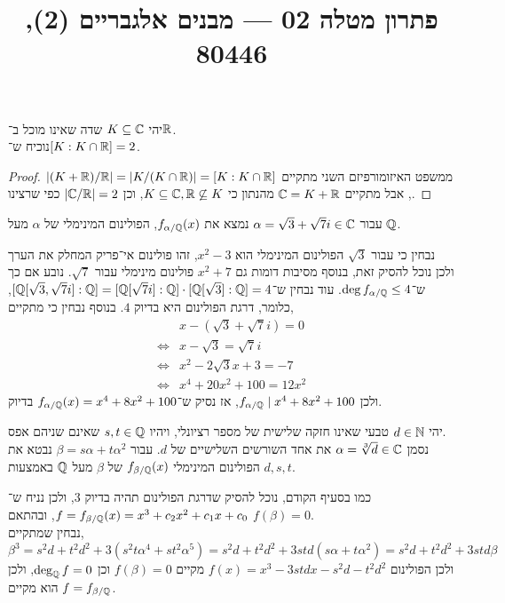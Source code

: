 
\title{פתרון מטלה 02 --- מבנים אלגבריים (2), 80446}


\maketitle
\maketitleprint{}

\question{}
יהי $K \subseteq \mathbb{C}$ שדה שאינו מוכל ב־$\mathbb{R}$. \\
נוכיח ש־$[K : K \cap \mathbb{R}] = 2$.
\begin{proof}
	ממשפט האיזומורפיזם השני מתקיים $|(K + \mathbb{R}) / \mathbb{R}| = |K / (K \cap \mathbb{R})| = [K : K \cap \mathbb{R}]$, אבל מתקיים $\mathbb{C} = K + \mathbb{R}$ מהנתון כי $K \subseteq \mathbb{C}, \mathbb{R} \not\subseteq K$, וכן $|\mathbb{C} / \mathbb{R}| = 2$ כפי שרצינו.
\end{proof}

\question{}
\subquestion{}
עבור $\alpha = \sqrt{3} + \sqrt{7} i \in \mathbb{C}$ נמצא את $f_{\alpha / \mathbb{Q}}(x)$, הפולינום המינימלי של $\alpha$ מעל $\mathbb{Q}$.
\begin{solution}
	נבחין כי עבור $\sqrt{3}$ הפולינום המינימלי הוא $x^2 - 3$, זהו פולינום אי־פריק המחלק את הערך ולכן נוכל להסיק זאת, בנוסף מסיבות דומות גם $x^2 + 7$ פולינום מינימלי עבור $\sqrt{7}$.
	נובע אם כך ש־$\deg f_{\alpha / \mathbb{Q}} \le 4$.
	עוד נבחין ש־$[\mathbb{Q}[\sqrt{3}, \sqrt{7}i] : \mathbb{Q}] = [\mathbb{Q}[\sqrt{7}i] : \mathbb{Q}] \cdot [\mathbb{Q}[\sqrt{3}] : \mathbb{Q}] = 4$, כלומר, דרגת הפולינום היא בדיוק $4$.
	בנוסף נבחין כי מתקיים,
	\begin{align*}
		& x - (\sqrt{3} + \sqrt{7} i) = 0 \\
		\iff & x - \sqrt{3} = \sqrt{7} i \\
		\iff & x^2 - 2 \sqrt{3} x + 3 = -7 \\
		\iff & x^4 + 20x^2 + 100 = 12x^2
	\end{align*}
	ולכן $f_{\alpha / \mathbb{Q}} \mid x^4 + 8x^2 + 100$, אז נסיק ש־$f_{\alpha / \mathbb{Q}}(x) = x^4 + 8x^2 + 100$ בדיוק.
\end{solution}

\subquestion{}
יהי $d \in \mathbb{N}$ טבעי שאינו חזקה שלישית של מספר רציונלי, ויהיו $s, t \in \mathbb{Q}$ שאינם שניהם אפס. \\
נסמן $\alpha = \sqrt[3]{d} \in \mathbb{C}$ את אחד השורשים השלישיים של $d$.
עבור $\beta = s \alpha + t \alpha^2$ נבטא את הפולינום המינימלי $f_{\beta / \mathbb{Q}}(x)$ של $\beta$ מעל $\mathbb{Q}$ באמצעות $d, s, t$.
\begin{solution}
	כמו בסעיף הקודם, נוכל להסיק שדרגת הפולינום תהיה בדיוק $3$, ולכן נניח ש־$f = f_{\beta / \mathbb{Q}}(x) = x^3 + c_2 x^2 + c_1 x + c_0$, ובהתאם $f(\beta) = 0$. \\
	נבחין שמתקיים,
	\[
		\beta^3
		= s^2 d + t^2 d^2 + 3(s^2 t \alpha^4 + s t^2 \alpha^5)
		= s^2 d + t^2 d^2 + 3std (s \alpha + t \alpha^2)
		= s^2 d + t^2 d^2 + 3std \beta
	\]
	ולכן הפולינום $f(x) = x^3 - 3std x - s^2 d - t^2 d^2$ מקיים $f(\beta) = 0$ וכן $\deg_{\mathbb{Q}} f = 0$, ולכן הוא מקיים $f = f_{\beta / \mathbb{Q}}$.
\end{solution}


